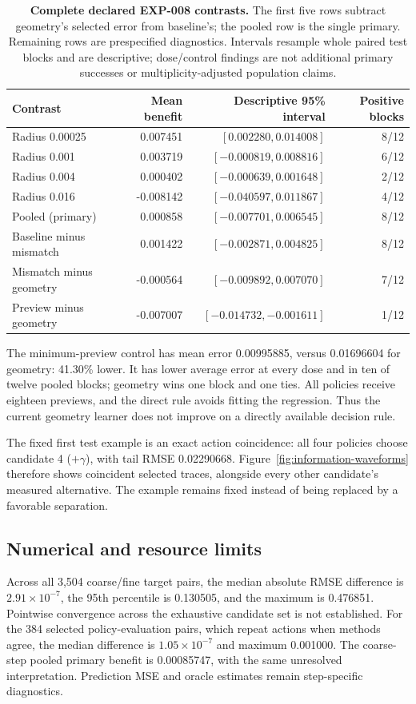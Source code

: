 \begin{table}[H]
\centering\small
\begin{tabular}{lrrr}
\toprule
Contrast & Mean benefit & Descriptive 95\% interval & Positive blocks \\
\midrule
Radius 0.00025 & 0.007451 & $[0.002280,0.014008]$ & 8/12 \\
Radius 0.001 & 0.003719 & $[-0.000819,0.008816]$ & 6/12 \\
Radius 0.004 & 0.000402 & $[-0.000639,0.001648]$ & 2/12 \\
Radius 0.016 & -0.008142 & $[-0.040597,0.011867]$ & 4/12 \\
Pooled (primary) & 0.000858 & $[-0.007701,0.006545]$ & 8/12 \\
\midrule
Baseline minus mismatch & 0.001422 & $[-0.002871,0.004825]$ & 8/12 \\
Mismatch minus geometry & -0.000564 & $[-0.009892,0.007070]$ & 7/12 \\
Preview minus geometry & -0.007007 & $[-0.014732,-0.001611]$ & 1/12 \\
\bottomrule
\end{tabular}
\caption{\textbf{Complete declared EXP-008 contrasts.} The first five rows subtract geometry's selected error from baseline's; the pooled row is the single primary. Remaining rows are prespecified diagnostics. Intervals resample whole paired test blocks and are descriptive; dose/control findings are not additional primary successes or multiplicity-adjusted population claims.}
\label{tab:information-contrasts}
\end{table}
The minimum-preview control has mean error 0.00995885, versus 0.01696604 for geometry: 41.30\% lower. It has lower average error at every dose and in ten of twelve pooled blocks; geometry wins one block and one ties. All policies receive eighteen previews, and the direct rule avoids fitting the regression. Thus the current geometry learner does not improve on a directly available decision rule.

The fixed first test example is an exact action coincidence: all four policies choose candidate 4 ($+\gamma$), with tail RMSE 0.02290668. Figure~\ref{fig:information-waveforms} therefore shows coincident selected traces, alongside every other candidate's measured alternative. The example remains fixed instead of being replaced by a favorable separation.

\subsection{Numerical and resource limits}
Across all 3,504 coarse/fine target pairs, the median absolute RMSE difference is $2.91\times10^{-7}$, the 95th percentile is 0.130505, and the maximum is 0.476851. Pointwise convergence across the exhaustive candidate set is not established. For the 384 selected policy-evaluation pairs, which repeat actions when methods agree, the median difference is $1.05\times10^{-7}$ and maximum 0.001000. The coarse-step pooled primary benefit is 0.00085747, with the same unresolved interpretation. Prediction MSE and oracle estimates remain step-specific diagnostics.

